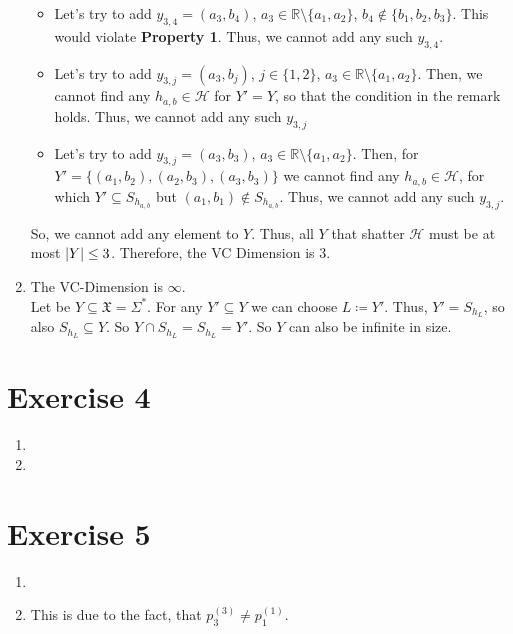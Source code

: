 \documentclass[12pt]{article}
\DeclarePairedDelimiter\abs{\lvert}{\rvert}
\begin{document}
\begin{enumerate}[label=(\alph*)]
\begin{itemize}
				\item	Let's try to add $y_{3,4} = (a_3, b_4)$, $a_3 \in \mathbb{R}\setminus\{a_1, a_2\}$, $b_4 \not\in \{b_1, b_2, b_3\}$. This would violate \textbf{Property 1}. Thus, we cannot add any such $y_{3,4}$.
				\item	Let's try to add $y_{3,j} = (a_3, b_j)$, $j \in \{1,2\}$, $a_3 \in \mathbb{R}\setminus\{a_1, a_2\}$. Then, we cannot find any $h_{a,b} \in \mathcal{H}$ for $Y' = Y$, so that the condition in the remark holds. Thus, we cannot add any such $y_{3,j}$
				\item	Let's try to add $y_{3,j} = (a_3, b_3)$, $a_3 \in \mathbb{R}\setminus\{a_1, a_2\}$. Then, for $Y' = \{(a_1, b_2), (a_2,b_3), (a_3, b_3)\}$ we cannot find any $h_{a,b} \in \mathcal{H}$, for which $Y' \subseteq S_{h_{a,b}}$ but $(a_1, b_1) \not\in S_{h_{a,b}}$. Thus, we cannot add any such $y_{3,j}$.
			\end{itemize}
			So, we cannot add any element to $Y$. Thus, all $Y$ that shatter $\mathcal{H}$ must be at most $\abs{Y} \leq 3$. Therefore, the VC Dimension is $3$.
	\item	The VC-Dimension is $\infty$. \\
			Let be $Y \subseteq \mathfrak{X} = \Sigma^*$. For any $Y' \subseteq Y$ we can choose $L \coloneqq Y'$. Thus, $Y' = S_{h_L}$, so also $S_{h_L} \subseteq Y$. So $Y \cap S_{h_L} = S_{h_L} = Y'$. So $Y$ can also be infinite in size.
\end{enumerate}

\section*{Exercise 4}
\begin{enumerate}[label=(\alph*)]
	\item
	\item
\end{enumerate}

\section*{Exercise 5}
\begin{enumerate}[label=(\alph*)]
	\item	
	\item	This is due to the fact, that $p_3^{(3)} \neq p_1^{(1)}$.
\end{enumerate}
\end{document}
